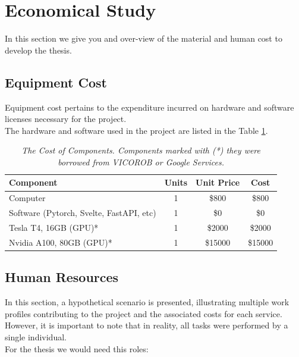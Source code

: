 \section{Economical Study}

In this section we give you and over-view of the material and human cost to
develop the thesis.

\subsection{Equipment Cost}

Equipment cost pertains to the expenditure incurred on hardware and software
licenses necessary for the project. \\

The hardware and software used in the project are listed in the Table
\ref{table:equipment_cost}.

\begin{table}[H]
  \centering
  \begin{tabular}{lccc}
    \toprule
    \textbf{Component} & \textbf{Units} & \textbf{Unit Price} & \textbf{Cost} \\
    \midrule
    Computer & 1 & \$800 & \$800 \\
    Software (Pytorch, Svelte, FastAPI, etc) & 1 & \$0 & \$0 \\
    Tesla T4, 16GB (GPU)* & 1 & \$2000 & \$2000 \\
    Nvidia A100, 80GB (GPU)* & 1 & \$15000 & \$15000 \\
    \bottomrule
  \end{tabular}
  \caption[The Cost of Components.]
  {\textit{The Cost of Components.
  Components marked with (*) they were borrowed from VICOROB or
  Google Services. }}
  {\label{table:equipment_cost}}
\end{table}

\subsection{Human Resources}

In this section, a hypothetical scenario is presented, illustrating multiple
work profiles contributing to the project and the associated costs for each
service. However, it is important to note that in reality, all tasks were
performed by a single individual. \\

For the thesis we would need this roles: \\

